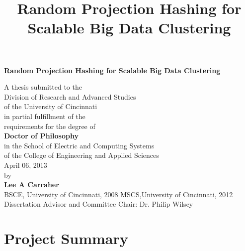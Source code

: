 \documentclass[a4paper,10pt]{article}
\title{Random Projection Hashing for Scalable Big Data Clustering}
\begin{document}
\begin{center}
\LARGE{\textbf{Random Projection Hashing for Scalable Big Data Clustering}}
\vspace*{0.4in}

  {\large A thesis submitted to the\\[0.20in]
    Division of Research and Advanced Studies\\
    of the University of Cincinnati\\[0.20in]
    in partial fulfillment of the\\
    requirements for the degree of\\[0.20in]
    {\bf Doctor of Philosophy}\\[0.20in]
    in the School of Electric and Computing Systems\\
    of the College of Engineering and Applied Sciences\\[0.20in]
    April 06, 2013\\[0.20in]
    by\\[0.20in]
    {\bf Lee A Carraher}\\
    BSCE, University of Cincinnati, 2008
    MSCS,University of Cincinnati, 2012 \\
    \vspace*{0.4in}
  {\large Dissertation Advisor and Committee Chair:  Dr. Philip Wilsey}}
\end{center}

\newpage

\pagestyle{fancy}
\section{Project Summary} 
\end{document}

